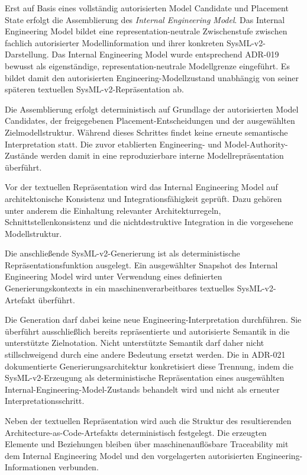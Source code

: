 Erst auf Basis eines vollständig autorisierten Model Candidate und Placement
State erfolgt die Assemblierung des \emph{Internal Engineering Model}.
Das Internal Engineering Model bildet eine representation-neutrale
Zwischenstufe zwischen fachlich autorisierter Modellinformation und ihrer
konkreten SysML-v2-Darstellung. Das Internal Engineering Model wurde entsprechend ADR-019 bewusst als
eigenständige, representation-neutrale Modellgrenze eingeführt. Es bildet
damit den autorisierten Engineering-Modellzustand unabhängig von seiner
späteren textuellen SysML-v2-Repräsentation ab.

Die Assemblierung erfolgt deterministisch auf Grundlage der autorisierten
Model Candidates, der freigegebenen Placement-Entscheidungen und der
ausgewählten Zielmodellstruktur. Während dieses Schrittes findet keine erneute
semantische Interpretation statt. Die zuvor etablierten Engineering- und
Model-Authority-Zustände werden damit in eine reproduzierbare interne
Modellrepräsentation überführt.

Vor der textuellen Repräsentation wird das Internal Engineering Model auf
architektonische Konsistenz und Integrationsfähigkeit geprüft. Dazu gehören
unter anderem die Einhaltung relevanter Architekturregeln,
Schnittstellenkonsistenz und die nichtdestruktive Integration in die
vorgesehene Modellstruktur.

Die anschließende SysML-v2-Generierung ist als deterministische
Repräsentationsfunktion ausgelegt. Ein ausgewählter Snapshot des Internal
Engineering Model wird unter Verwendung eines definierten
Generierungskontexts in ein maschinenverarbeitbares textuelles
SysML-v2-Artefakt überführt.

Die Generation darf dabei keine neue Engineering-Interpretation durchführen.
Sie überführt ausschließlich bereits repräsentierte und autorisierte Semantik
in die unterstützte Zielnotation. Nicht unterstützte Semantik darf daher nicht
stillschweigend durch eine andere Bedeutung ersetzt werden. Die in ADR-021 dokumentierte Generierungsarchitektur konkretisiert diese
Trennung, indem die SysML-v2-Erzeugung als deterministische Repräsentation
eines ausgewählten Internal-Engineering-Model-Zustands behandelt wird und
nicht als erneuter Interpretationsschritt.

Neben der textuellen Repräsentation wird auch die Struktur des resultierenden
Architecture-as-Code-Artefakts deterministisch festgelegt. Die erzeugten
Elemente und Beziehungen bleiben über maschinenauflösbare Traceability mit dem
Internal Engineering Model und den vorgelagerten autorisierten
Engineering-Informationen verbunden.


